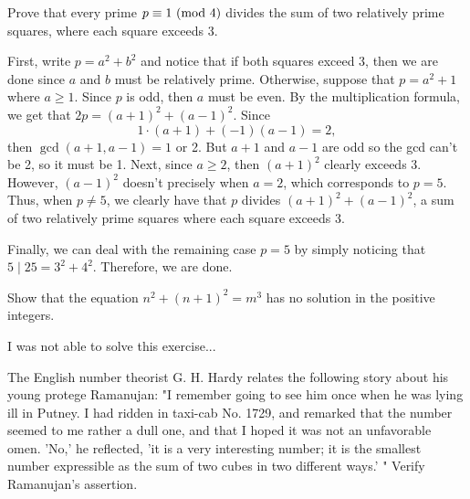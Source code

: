 \begin{exercise}
    Prove that every prime $p \equiv 1 \ (\mathrm{mod}\ 4)$ divides the sum of two relatively prime squares, where each square exceeds 3.  \\
\end{exercise}

\begin{solution}
    First, write $p = a^2 + b^2$ and notice that if both squares exceed 3, then we are done since $a$ and $b$ must be relatively prime. Otherwise, suppose that $p = a^2 + 1$ where $a \geq 1$. Since $p$ is odd, then $a$ must be even. By the multiplication formula, we get that $2p = (a+1)^2 + (a-1)^2$. Since
    $$1\cdot(a+1) + (-1)(a-1) = 2,$$
    then $\gcd(a+1, a-1) = 1$ or 2. But $a+1$ and $a-1$ are odd so the gcd can't be 2, so it must be 1. Next, since $a \geq 2$, then $(a+1)^2$ clearly exceeds 3. However, $(a-1)^2$ doesn't precisely when $a = 2$, which corresponds to $p  = 5$. Thus, when $p \neq 5$, we clearly have that $p$ divides $(a+1)^2 + (a-1)^2$, a sum of two relatively prime squares where each square exceeds 3.
    
    Finally, we can deal with the remaining case $p = 5$ by simply noticing that $5 \mid 25 = 3^2 + 4^2$. Therefore, we are done. \\
\end{solution}

\begin{exercise}
    Show that the equation $n^2 + (n+1)^2 = m^3$ has no solution in the positive integers. \\
\end{exercise}

\begin{solution}
    I was not able to solve this exercise... \\
\end{solution}

\begin{exercise}
    The English number theorist G. H. Hardy relates the following story about his young protege Ramanujan: "I remember going to see him once when he was lying ill in Putney. I had ridden in taxi-cab No. 1729, and remarked that the number seemed to me rather a dull one, and that I hoped it was not an unfavorable omen. 'No,' he reflected, 'it is a very interesting number; it is the smallest number expressible as the sum of two cubes in two different ways.' " Verify Ramanujan's assertion. \\
\end{exercise}

